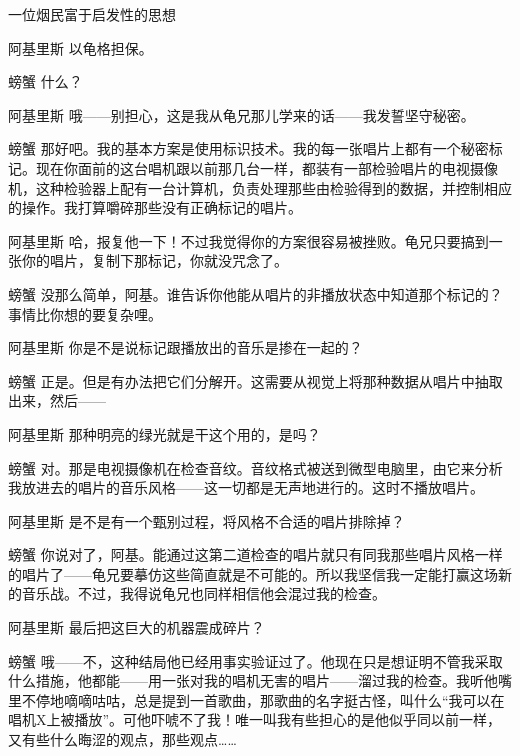 \begin{dialog}{一位烟民富于启发性的思想}
\begin{dialogue}
\item[阿基里斯]以龟格担保。

\item[螃蟹]什么？

\item[阿基里斯]哦——别担心，这是我从龟兄那儿学来的话——我发誓坚守秘密。

\item[螃蟹]那好吧。我的基本方案是使用标识技术。我的每一张唱片上都有一个秘密标记。现在你面前的这台唱机跟以前那几台一样，都装有一部检验唱片的电视摄像机，这种检验器上配有一台计算机，负责处理那些由检验得到的数据，并控制相应的操作。我打算嚼碎那些没有正确标记的唱片。

\item[阿基里斯]哈，报复他一下！不过我觉得你的方案很容易被挫败。龟兄只要搞到一张你的唱片，复制下那标记，你就没咒念了。

\item[螃蟹]没那么简单，阿基。谁告诉你他能从唱片的非播放状态中知道那个标记的？事情比你想的要复杂哩。

\item[阿基里斯]你是不是说标记跟播放出的音乐是掺在一起的？

\item[螃蟹]正是。但是有办法把它们分解开。这需要从视觉上将那种数据从唱片中抽取出来，然后——

\item[阿基里斯]那种明亮的绿光就是干这个用的，是吗？

\item[螃蟹]对。那是电视摄像机在检查音纹。音纹格式被送到微型电脑里，由它来分析我放进去的唱片的音乐风格——这一切都是无声地进行的。这时不播放唱片。

\item[阿基里斯]是不是有一个甄别过程，将风格不合适的唱片排除掉？

\item[螃蟹]你说对了，阿基。能通过这第二道检查的唱片就只有同我那些唱片风格一样的唱片了——龟兄要摹仿这些简直就是不可能的。所以我坚信我一定能打赢这场新的音乐战。不过，我得说龟兄也同样相信他会混过我的检查。

\item[阿基里斯]最后把这巨大的机器震成碎片？

\item[螃蟹]哦——不，这种结局他已经用事实验证过了。他现在只是想证明不管我采取什么措施，他都能——用一张对我的唱机无害的唱片——溜过我的检查。我听他嘴里不停地嘀嘀咕咕，总是提到一首歌曲，那歌曲的名字挺古怪，叫什么“我可以在唱机X上被播放”。可他吓唬不了我！唯一叫我有些担心的是他似乎同以前一样，又有些什么晦涩的观点，那些观点……


\end{dialogue}
\end{dialog}

